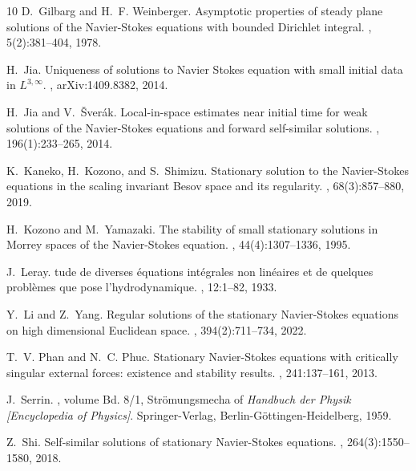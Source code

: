 \documentclass[12pt]{amsart}
\begin{document}
\begin{thebibliography}{10}
	D.~Gilbarg and H.~F. Weinberger.
	\newblock Asymptotic properties of steady plane solutions of the
	{N}avier-{S}tokes equations with bounded {D}irichlet integral.
	, 5(2):381--404, 1978.
	
	H.~Jia.
	\newblock Uniqueness of solutions to {N}avier {S}tokes equation with small
	initial data in {$L^{3,\infty}$}.
	, arXiv:1409.8382, 2014.
	
	H.~Jia and V.~\v{S}ver\'{a}k.
	\newblock Local-in-space estimates near initial time for weak solutions of the
	{N}avier-{S}tokes equations and forward self-similar solutions.
	, 196(1):233--265, 2014.
	
	K.~Kaneko, H.~Kozono, and S.~Shimizu.
	\newblock Stationary solution to the {N}avier-{S}tokes equations in the scaling
	invariant {B}esov space and its regularity.
	, 68(3):857--880, 2019.
	
	H.~Kozono and M.~Yamazaki.
	\newblock The stability of small stationary solutions in {M}orrey spaces of the
	{N}avier-{S}tokes equation.
	, 44(4):1307--1336, 1995.
	
	J.~Leray.
	tude de diverses {\'e}quations int{\'e}grales non lin{\'e}aires
	et de quelques probl{\`e}mes que pose l'hydrodynamique.
	, 12:1--82, 1933.
	
	Y.~Li and Z.~Yang.
	\newblock Regular solutions of the stationary {N}avier-{S}tokes equations on
	high dimensional {E}uclidean space.
	, 394(2):711--734, 2022.
	
	T.~V. Phan and N.~C. Phuc.
	\newblock Stationary {N}avier-{S}tokes equations with critically singular
	external forces: existence and stability results.
	, 241:137--161, 2013.
	
	J.~Serrin.
	, volume
	Bd. 8/1, Str\"omungsmecha of {\em Handbuch der Physik [Encyclopedia of
		Physics]}.
	\newblock Springer-Verlag, Berlin-G\"ottingen-Heidelberg, 1959.
	
	Z.~Shi.
	\newblock Self-similar solutions of stationary {N}avier-{S}tokes equations.
	, 264(3):1550--1580, 2018.
	

\end{thebibliography}
\end{document}
